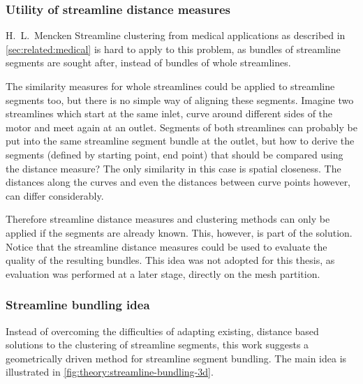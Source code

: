 \subsubsection{Utility of streamline distance measures}

{H.~L.~Mencken}%
%
Streamline clustering from medical applications as described in \autoref{sec:related:medical} is hard to apply to this problem, as bundles of streamline segments are sought after, instead of bundles of whole streamlines.


The similarity measures for whole streamlines could be applied to streamline segments too, but there is no simple way of aligning these segments. Imagine two streamlines which start at the same inlet, curve around different sides of the motor and meet again at an outlet. Segments of both streamlines can probably be put into the same streamline segment bundle at the outlet, but how to derive the segments (defined by starting point, end point) that should be compared using the distance measure? The only similarity in this case is spatial closeness. The distances along the curves and even the distances between curve points however, can differ considerably.

Therefore streamline distance measures and clustering methods can only be applied if the segments are already known. This, however, is part of the solution. Notice that the streamline distance measures could be used to evaluate the quality of the resulting bundles. This idea was not adopted for this thesis, as evaluation was performed at a later stage, directly on the mesh partition.


\subsubsection{Streamline bundling idea}
\label{sec:theory:streamline-bundling-idea}

Instead of overcoming the difficulties of adapting existing, distance based solutions to the clustering of streamline segments, this work suggests a geometrically driven method for streamline segment bundling. The main idea is illustrated in \autoref{fig:theory:streamline-bundling-3d}.

